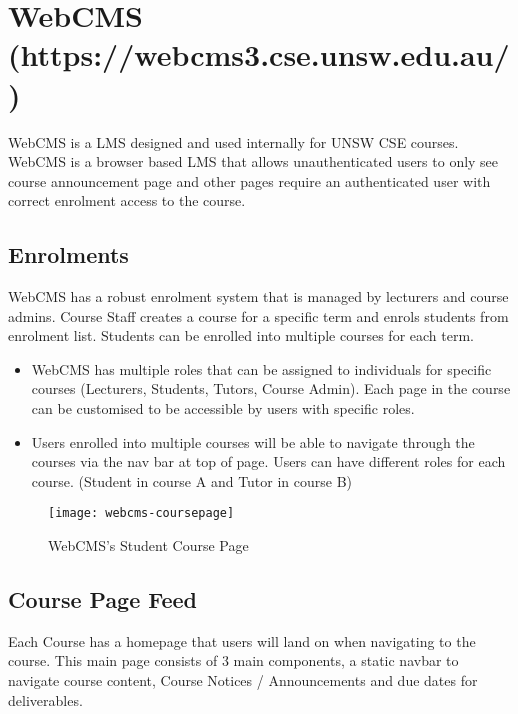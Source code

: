 \section{WebCMS (https://webcms3.cse.unsw.edu.au/)}

WebCMS is a LMS designed and used internally for UNSW CSE courses. WebCMS is a browser based LMS that allows unauthenticated users to only see course announcement page and other pages require an authenticated user with correct enrolment access to the course.

\subsection{Enrolments}
WebCMS has a robust enrolment system that is managed by lecturers and course admins. Course Staff creates a course for a specific term and enrols students from enrolment list. Students can be enrolled into multiple courses for each term.

\begin{itemize}
	\item WebCMS has multiple roles that can be assigned to individuals for specific courses (Lecturers, Students, Tutors, Course Admin). Each page in the course can be customised to be accessible by users with specific roles.
	\item Users enrolled into multiple courses will be able to navigate through the courses via the nav bar at top of page. Users can have different roles for each course. (Student in course A and Tutor in course B)
\end{itemize}
\newpage

\begin{figure}[h!]
    \centering
    \texttt{[image: webcms-coursepage]}
    \caption{WebCMS's Student Course Page}
\end{figure}

\subsection{Course Page Feed}
Each Course has a homepage that users will land on when navigating to the course. This main page consists of 3 main components, a static navbar to navigate course content, Course Notices / Announcements and due dates for deliverables.

